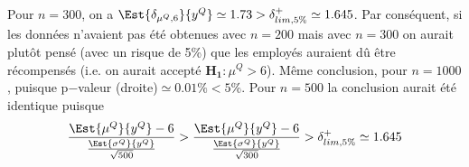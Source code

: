 \documentclass[10pt]{report}
\begin{document}
\begin{exercice}
\begin{enumerate}
\begin{Correction}
Pour $n=300$, on a $\Est{\delta_{\mu^Q,6}}{y^Q}\simeq 1.73>\delta_{lim,5\%}^+\simeq1.645$. Par conséquent, si les données n'avaient pas été obtenues avec $n=200$ mais avec $n=300$ on aurait plutôt pensé (avec un risque de 5\%) que les employés auraient dû être récompensés (i.e. on aurait accepté $\mathbf{H_1}: \mu^Q>6$). Même conclusion, pour $n=1000$, puisque p$-$valeur (droite)$\simeq 0.01\%<5\%$. Pour $n=500$ la conclusion aurait été identique puisque
$$
\frac{\Est{\mu^Q}{y^Q}-6}{ \frac{ \Est{\sigma^Q}{y^Q}}{\sqrt{500}} } > 
\frac{\Est{\mu^Q}{y^Q}-6}{ \frac{ \Est{\sigma^Q}{y^Q}}{\sqrt{300}} } > \delta_{lim,5\%}^+\simeq1.645
$$
\end{Correction}
 
\end{enumerate}
\end{exercice}
\end{document}
